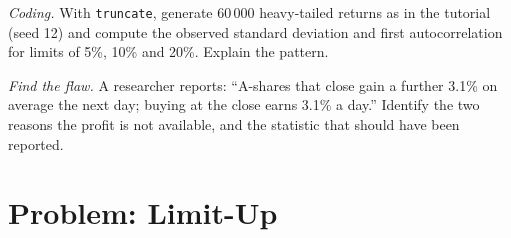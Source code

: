 \begin{exercise}[$\star\star\star$]\label{exo:m1:asian-and-emerging-equity-markets:7}
\emph{Coding.} With \texttt{truncate}, generate 60\,000 heavy-tailed returns
as in the tutorial (seed 12) and compute the observed standard deviation and
first autocorrelation for limits of 5\%, 10\% and 20\%. Explain the pattern.
\end{exercise}

\begin{exercise}[$\star\star\star$]\label{exo:m1:asian-and-emerging-equity-markets:8}
\emph{Find the flaw.} A researcher reports: ``A-shares that close 
gain a further 3.1\% on average the next day; buying at the  close
earns 3.1\% a day.'' Identify the two reasons the profit is not available,
and the statistic that should have been reported.
\end{exercise}

\section{Problem: Limit-Up}

